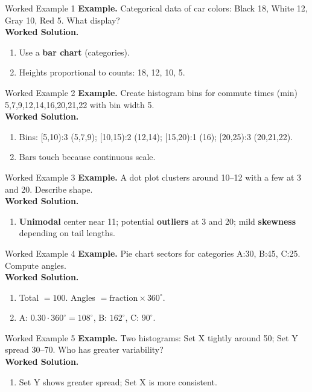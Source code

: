 \documentclass[aspectratio=169]{beamer}
\newcommand{\exampletitle}[1]{\vspace{0.25em}\textbf{Example.} #1\vspace{0.25em}}
\newcommand{\worked}{\textbf{Worked Solution.}}
\begin{document}
\begin{frame}{Worked Example 1}
\exampletitle{Categorical data of car colors: Black 18, White 12, Gray 10, Red 5. What display?}\\[0.25em]
\worked
\begin{enumerate}
  \item Use a \textbf{bar chart} (categories).
  \item Heights proportional to counts: 18, 12, 10, 5.
\end{enumerate}
\end{frame}

\begin{frame}{Worked Example 2}
\exampletitle{Create histogram bins for commute times (min) 5,7,9,12,14,16,20,21,22 with bin width 5.}\\[0.25em]
\worked
\begin{enumerate}
  \item Bins: [5,10):3 (5,7,9); [10,15):2 (12,14); [15,20):1 (16); [20,25):3 (20,21,22).
  \item Bars touch because continuous scale.
\end{enumerate}
\end{frame}

\begin{frame}{Worked Example 3}
\exampletitle{A dot plot clusters around 10--12 with a few at 3 and 20. Describe shape.}\\[0.25em]
\worked
\begin{enumerate}
  \item \textbf{Unimodal} center near 11; potential \textbf{outliers} at 3 and 20; mild \textbf{skewness} depending on tail lengths.
\end{enumerate}
\end{frame}

\begin{frame}{Worked Example 4}
\exampletitle{Pie chart sectors for categories A:30, B:45, C:25. Compute angles.}\\[0.25em]
\worked
\begin{enumerate}
  \item Total $=100$. Angles $= \text{fraction}\times 360^\circ$.
  \item A: $0.30\cdot 360^\circ=108^\circ$, B: $162^\circ$, C: $90^\circ$.
\end{enumerate}
\end{frame}

\begin{frame}{Worked Example 5}
\exampletitle{Two histograms: Set X tightly around 50; Set Y spread 30--70. Who has greater variability?}\\[0.25em]
\worked
\begin{enumerate}
  \item Set Y shows greater spread; Set X is more consistent.
\end{enumerate}
\end{frame}
\end{document}
